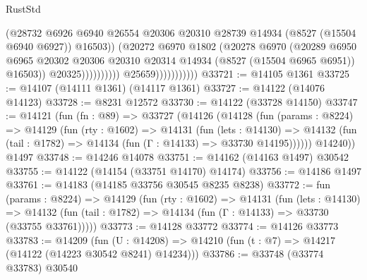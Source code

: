 \begin{lexlean}{RustStd}
\begin{coremodule}
                                              (@28732
                                                @6926
                                                @6940
                                                @26554
                                                @20306
                                                @20310
                                                @28739
                                                @14934
                                                (@8527 (@15504 @6940 @6927))
                                                @16503))
                                            (@20272
                                              @6970
                                              @1802
                                              (@20278
                                                @6970
                                                (@20289
                                                  @6950
                                                  @6965
                                                  @20302
                                                  @20306
                                                  @20310
                                                  @20314
                                                  @14934
                                                  (@8527 (@15504 @6965 @6951))
                                                  @16503))
                                              @20325))))))))))
                          @25659)))))))))))
@33721 := @14105 @1361
@33725 := @14107 (@14111 @1361) (@14117 @1361)
@33727 := @14122 (@14076 @14123)
@33728 := @8231 @12572
@33730 := @14122 (@33728 @14150)
@33747 := @14121
    (fun (fn : @89) =>
    @33727
      (@14126
        (@14128
          (fun (params : @8224) =>
          @14129
            (fun (rty : @1602) =>
            @14131
              (fun (lets : @14130) =>
              @14132 (fun (tail : @1782) => @14134 (fun (Γ : @14133) => @33730 @14195))))))
        @14240))
    @1497
@33748 := @14246 @14078
@33751 := @14162 (@14163 @1497) @30542
@33755 := @14122 (@14154 (@33751 @14170) @14174)
@33756 := @14186 @1497
@33761 := @14183 (@14185 @33756 @30545 @8235 @8238)
@33772 := fun (params : @8224) =>
  @14129
    (fun (rty : @1602) =>
    @14131
      (fun (lets : @14130) =>
      @14132 (fun (tail : @1782) => @14134 (fun (Γ : @14133) => @33730 (@33755 @33761)))))
@33773 := @14128 @33772
@33774 := @14126 @33773
@33783 := @14209
    (fun (U : @14208) => @14210 (fun (t : @7) => @14217 (@14122 (@14223 @30542 @8241) @14234)))
@33786 := @33748 (@33774 @33783) @30540

\end{coremodule}
\end{lexlean}
